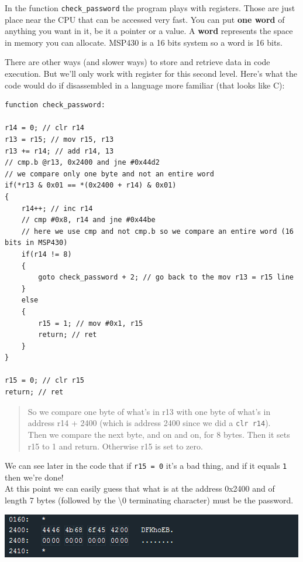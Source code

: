 In the function \texttt{check\_password} the program plays with
registers. Those are just place near the CPU that can be accessed very
fast. You can put \textbf{one word} of anything you want in it, be it a
pointer or a value. A \textbf{word} represents the space in memory you
can allocate. MSP430 is a 16 bits system so a word is 16 bits.

There are other ways (and slower ways) to store and retrieve data in
code execution. But we'll only work with register for this second level.
Here's what the code would do if disassembled in a language more
familiar (that looks like C):

\begin{verbatim}
function check_password:

r14 = 0; // clr r14
r13 = r15; // mov r15, r13
r13 += r14; // add r14, 13
// cmp.b @r13, 0x2400 and jne #0x44d2
// we compare only one byte and not an entire word
if(*r13 & 0x01 == *(0x2400 + r14) & 0x01)
{
    r14++; // inc r14
    // cmp #0x8, r14 and jne #0x44be
    // here we use cmp and not cmp.b so we compare an entire word (16 bits in MSP430)
    if(r14 != 8)
    { 
        goto check_password + 2; // go back to the mov r13 = r15 line
    }
    else
    {
        r15 = 1; // mov #0x1, r15
        return; // ret
    }
}

r15 = 0; // clr r15
return; // ret
\end{verbatim}

\begin{quote}
So we compare one byte of what's in r13 with one byte of what's in
address r14 + 2400 (which is address 2400 since we did a
\texttt{clr r14}).\\Then we compare the next byte, and on and on, for 8
bytes. Then it sets r15 to 1 and return. Otherwise r15 is set to zero.
\end{quote}

We can see later in the code that if \texttt{r15 = 0} it's a bad thing,
and if it equals \texttt{1} then we're done!\\At this point we can
easily guess that what is at the address 0x2400 and of length 7 bytes
(followed by the \textbackslash{}0 terminating character) must be the
password.

\includegraphics{img/1_6.png}

